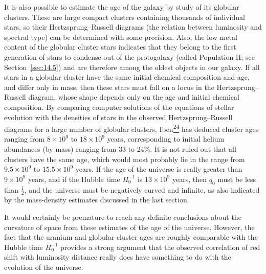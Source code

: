 It is also possible to estimate the age of the galaxy by study of its globular
clusters. These are large compact clusters containing thousands of individual
stars, so their Hertzsprung--Russell diagrams (the relation between luminosity
and spectral type) can be determined with some precision. Also, the low metal
content of the globular cluster stars indicates that they belong to the first
generation of stars to condense out of the protogalaxy (called Population II;
see Section~\ref{sec:14.5}) and are therefore among the oldest objects in our
galaxy. If all stars in a globular cluster have the same initial chemical
composition and age, and differ only in mass, then these stars must fall on a
locus in the Hertzsprung--Russell diagram, whose shape depends only on the age
and initial chemical composition. By comparing computer solutions of the
equations of stellar evolution with the densities of stars in the observed
Hertzsprung--Russell diagrams for a large number of globular clusters,
Iben\hyperref[ch15-ref-24]{\textsuperscript{24}} has deduced cluster ages
ranging from \(8\times10^9\) to \(18\times10^9\) years, corresponding to
initial helium abundances (by mass) ranging from 33 to 24\%. It is not ruled
out that all clusters have the same age, which would most probably lie in the
range from \(9.5\times10^9\) to \(15.5\times10^9\) years. If the age of
the universe is really greater than \(9\times10^9\) years, and if the Hubble
time \(H_0^{-1}\) is \(13\times10^9\) years, then \(q_0\) must be less than
\(\tfrac12\), and the universe must be negatively curved and infinite, as
also indicated by the mass-density estimates discussed in the last section.

It would certainly be premature to reach any definite conclusions about the
curvature of space from these estimates of the age of the universe. However,
the fact that the uranium and globular-cluster ages are roughly comparable with
the Hubble time \(H_0^{-1}\) provides a strong argument that the observed
correlation of red shift with luminosity distance really does have something
to do with the evolution of the universe.

